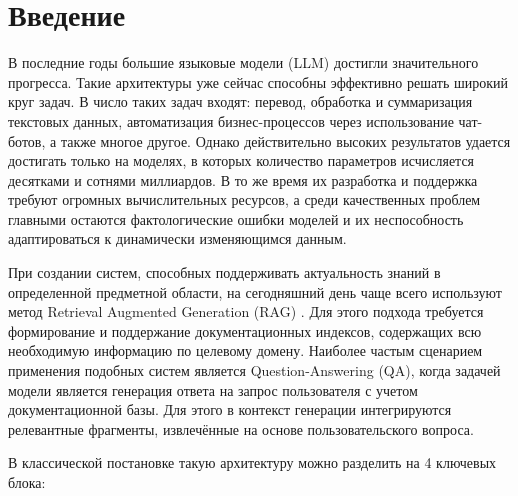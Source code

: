 \section{Введение}
\label{sec:Intro} 

В последние годы большие языковые модели (LLM) достигли значительного прогресса. Такие архитектуры уже сейчас способны эффективно решать широкий круг задач. В число таких задач входят: перевод, обработка и суммаризация текстовых данных, автоматизация бизнес-процессов через использование чат-ботов, а также многое другое. Однако действительно высоких результатов удается достигать только на моделях, в которых количество параметров исчисляется десятками и сотнями миллиардов. В то же время их разработка и поддержка требуют огромных вычислительных ресурсов, а среди качественных проблем главными остаются фактологические ошибки моделей и их неспособность адаптироваться к динамически изменяющимся данным.

При создании систем, способных поддерживать актуальность знаний в определенной предметной области, на сегодняшний день чаще всего используют метод Retrieval Augmented Generation (RAG) \cite{RAG}. Для этого подхода требуется формирование и поддержание документационных индексов, содержащих всю необходимую информацию по целевому домену. Наиболее частым сценарием применения подобных систем является Question-Answering (QA), когда задачей модели является генерация ответа на запрос пользователя с учетом документационной базы. Для этого в контекст генерации интегрируются релевантные фрагменты, извлечённые на основе пользовательского вопроса. 

В классической постановке такую архитектуру можно разделить на 4 ключевых блока:

